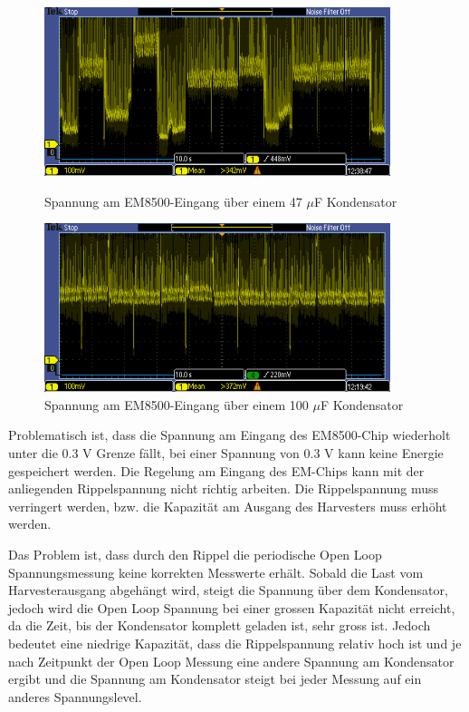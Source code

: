 \begin{figure}[ht]
   \begin{minipage}[t]{0.5\textwidth}
     \includegraphics[width=0.90\textwidth]{3Vorgehen/imag/VCC_47uF_15kmh_Periode.PNG}
     \caption{Spannung am EM8500-Eingang über einem 47 $\mu$F Kondensator}
	 \label{VCC_47uF_15kmh_Periode}
  \end{minipage}
  \begin{minipage}[t]{0.5\textwidth}
    \includegraphics[width=0.90\textwidth]{3Vorgehen/imag/VCC_100uF_15kmh_Periode.PNG}
    \caption{Spannung am EM8500-Eingang über einem 100 $\mu$F Kondensator}
	\label{VCC_100uF_15kmh_Periode}
  \end{minipage} 
\end{figure}

Problematisch ist, dass die Spannung am Eingang des EM8500-Chip wiederholt unter die 0.3 V Grenze fällt, bei einer Spannung von 0.3 V kann keine Energie gespeichert werden. Die Regelung am Eingang des EM-Chips kann mit der anliegenden Rippelspannung nicht richtig arbeiten. Die Rippelspannung muss verringert werden, bzw. die Kapazität am Ausgang des Harvesters muss erhöht werden. 

Das Problem ist, dass durch den Rippel die periodische Open Loop Spannungsmessung keine korrekten Messwerte erhält. Sobald die Last vom Harvesterausgang abgehängt wird, steigt die Spannung über dem Kondensator, jedoch wird die Open Loop Spannung bei einer grossen Kapazität nicht erreicht, da die Zeit, bis der Kondensator komplett geladen ist, sehr gross ist. Jedoch bedeutet eine niedrige Kapazität, dass die Rippelspannung relativ hoch ist und je nach Zeitpunkt der Open Loop Messung eine andere Spannung am Kondensator ergibt und die Spannung am Kondensator steigt bei jeder Messung auf ein anderes Spannungslevel.

